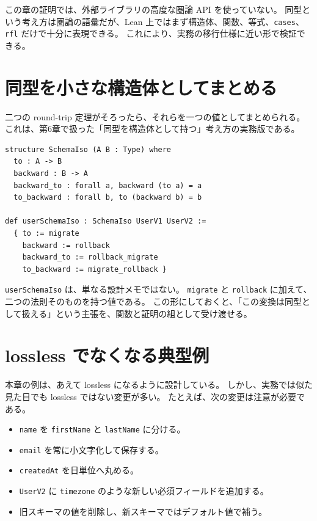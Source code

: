 \begin{leanbox}
この章の証明では、外部ライブラリの高度な圏論 API を使っていない。
同型という考え方は圏論の語彙だが、Lean 上ではまず構造体、関数、等式、\texttt{cases}、\texttt{rfl} だけで十分に表現できる。
これにより、実務の移行仕様に近い形で検証できる。
\end{leanbox}

\section{同型を小さな構造体としてまとめる}

二つの round-trip 定理がそろったら、それらを一つの値としてまとめられる。
これは、第6章で扱った「同型を構造体として持つ」考え方の実務版である。

\begin{listing}[htbp]
\begin{verbatim}
structure SchemaIso (A B : Type) where
  to : A -> B
  backward : B -> A
  backward_to : forall a, backward (to a) = a
  to_backward : forall b, to (backward b) = b

def userSchemaIso : SchemaIso UserV1 UserV2 :=
  { to := migrate
    backward := rollback
    backward_to := rollback_migrate
    to_backward := migrate_rollback }
\end{verbatim}
\caption{スキーマ同型を表す小さな構造体}
\label{lst:ch22-schema-iso}
\end{listing}

\texttt{userSchemaIso} は、単なる設計メモではない。
\texttt{migrate} と \texttt{rollback} に加えて、二つの法則そのものを持つ値である。
この形にしておくと、「この変換は同型として扱える」という主張を、関数と証明の組として受け渡せる。

\section{lossless でなくなる典型例}

本章の例は、あえて lossless になるように設計している。
しかし、実務では似た見た目でも lossless ではない変更が多い。
たとえば、次の変更は注意が必要である。

\begin{itemize}
\item \texttt{name} を \texttt{firstName} と \texttt{lastName} に分ける。
\item \texttt{email} を常に小文字化して保存する。
\item \texttt{createdAt} を日単位へ丸める。
\item \texttt{UserV2} に \texttt{timezone} のような新しい必須フィールドを追加する。
\item 旧スキーマの値を削除し、新スキーマではデフォルト値で補う。
\end{itemize}


